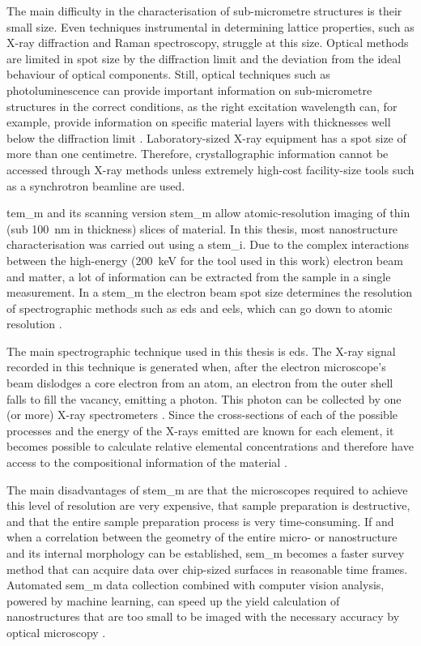 The main difficulty in the characterisation of sub-micrometre structures is their small size. Even techniques instrumental in determining lattice properties, such as X-ray diffraction and Raman spectroscopy, struggle at this size. Optical methods are limited in spot size by the diffraction limit and the deviation from the ideal behaviour of optical components. Still, optical techniques such as photoluminescence can provide important information on sub-micrometre structures in the correct conditions, as the right excitation wavelength can, for example, provide information on specific material layers with thicknesses well below the diffraction limit \cite{Scherrer2021}. Laboratory-sized X-ray equipment has a spot size of more than one centimetre. Therefore, crystallographic information cannot be accessed through X-ray methods unless extremely high-cost facility-size tools such as a synchrotron beamline are used. 

\Acf{tem_m} and its scanning version \acf{stem_m} allow atomic-resolution imaging of thin (sub \qty{100}{\nano\metre} in thickness) slices of material. In this thesis, most nanostructure characterisation was carried out using a \acl{stem_i}. Due to the complex interactions between the high-energy (\qty{200}{\kilo\eV} for the tool used in this work) electron beam and matter, a lot of information can be extracted from the sample in a single measurement. In a \acs{stem_m} the electron beam spot size determines the resolution of spectrographic methods such as \acf{eds} and \acf{eels}, which can go down to atomic resolution \cite{Bologna2018}. 

The main spectrographic technique used in this thesis is \acs{eds}. The X-ray signal recorded in this technique is generated when, after the electron microscope's beam dislodges a core electron from an atom, an electron from the outer shell falls to fill the vacancy, emitting a photon. This photon can be collected by one (or more) X-ray spectrometers \cite{EBNESAJJAD201439}. Since the cross-sections of each of the possible processes and the energy of the X-rays emitted are known for each element, it becomes possible to calculate relative elemental concentrations and therefore have access to the compositional information of the material \cite{Amari2012}.

The main disadvantages of \acs{stem_m} are that the microscopes required to achieve this level of resolution are very expensive, that sample preparation is destructive, and that the entire sample preparation process is very time-consuming. If and when a correlation between the geometry of the entire micro- or nanostructure and its internal morphology can be established, \acf{sem_m} becomes a faster survey method that can acquire data over chip-sized surfaces in reasonable time frames. Automated \acs{sem_m} data collection combined with computer vision analysis, powered by machine learning, can speed up the yield calculation of nanostructures that are too small to be imaged with the necessary accuracy by optical microscopy \cite{Lin2022, Modarres2017, Lee2020}.
